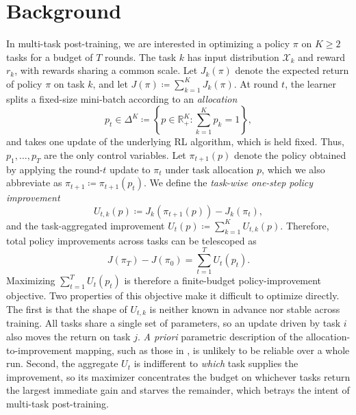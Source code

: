 \section{Background}
\label{sec:bg_allocation}

In multi-task post-training, we are interested in optimizing a policy $\pi$ on $K\ge 2$ tasks for a budget of $T$ rounds. The task $k$ has input distribution $\mathcal{X}_k$ and reward $r_k$, with rewards sharing a common scale. Let $J_k(\pi)$ denote the expected return of policy $\pi$ on task $k$, and let
$J(\pi)\coloneqq\sum_{k=1}^K J_k(\pi)$.
At round $t$, the learner splits a fixed-size mini-batch according to an \textit{allocation}
\[
p_t\in\Delta^K
\coloneqq
\left\{
p\in\mathbb{R}_+^K:
\sum_{k=1}^K p_k=1
\right\},
\]
and takes one update of the underlying RL algorithm, which is held fixed. Thus, $p_1,\ldots,p_T$ are the only control variables.
Let $\pi_{t+1}(p)$ denote the policy obtained by applying the round-$t$ update to $\pi_t$ under task allocation $p$, which we also abbreviate as $\pi_{t+1}\coloneqq\pi_{t+1}(p_t)$. We define the \textit{task-wise one-step policy improvement}
\[
U_{t,k}(p)
\coloneqq
J_k(\pi_{t+1}(p))-J_k(\pi_t),
\]
and the task-aggregated improvement
$U_t(p)\coloneqq\sum_{k=1}^K U_{t,k}(p)$.
Therefore, total policy improvements across tasks can be telescoped as
\begin{equation}
\label{eq:bg_telescope}
J(\pi_{T})-J(\pi_0)
=
\sum_{t=1}^{T} U_t(p_t).
\end{equation}
Maximizing $\sum_{t=1}^T U_t(p_t)$ is therefore a finite-budget policy-improvement objective. Two properties of this objective make it difficult to optimize directly. The first is that the shape of $U_{t,k}$ is neither known in advance nor stable across training. All tasks share a single set of parameters, so an update driven by task $i$ also moves the return on task $j$. \textit{A priori} parametric description of the allocation-to-improvement mapping, such as those in \cite{chen2025aioli}, is unlikely to be reliable over a whole run. Second, the aggregate $U_t$ is indifferent to \emph{which} task supplies the improvement, so its maximizer concentrates the budget on whichever tasks return the largest immediate gain and starves the remainder, which betrays the intent of multi-task post-training.




